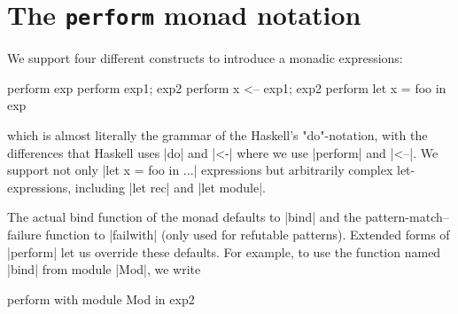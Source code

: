 \documentclass{elsart}
\begin{document}




\appendix
\section{The \texttt{perform} monad notation}
\label{app:perform}
We support four different constructs to introduce a monadic
expressions:
\begin{code}
  perform exp
  perform exp1; exp2
  perform x <-- exp1; exp2
  perform let x = foo in exp
\end{code}
which is almost literally the grammar of the Haskell's "do"-notation,
with the differences that Haskell uses |do| and |<-| where we use
|perform| and |<--|.
We support not only |let x = foo in ...|  expressions but arbitrarily
complex let-expressions, including |let rec| and |let module|.

The actual bind function of the monad defaults to |bind| and the
pattern-match--failure function to |failwith| (only used for refutable
patterns).  Extended forms of |perform| let us override these
defaults. For example, to use the function named 
|bind| from module |Mod|, we write
\begin{code}
        perform with module Mod in exp2
\end{code}
\end{document}
